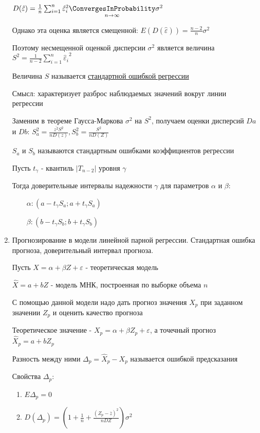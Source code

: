 \begin{enumerate}
    $D(\hat \varepsilon) = \frac{1}{n} \sum_{i = 1}^n {\hat \varepsilon_i}^2 \underset{n \to \infty}{\ConvergesInProbability} \sigma^2$

    Однако эта оценка является смещенной: $E(D(\hat \varepsilon)) = \frac{n - 2}{n} \sigma^2$

    Поэтому несмещенной оценкой дисперсии $\sigma^2$ является величина $S^2 = \frac{1}{n - 2} \sum_{i = 1}^n {\hat \varepsilon_i}^2$

    \Def Величина $S$ называется \hyperlink{regression_coefficient_error}{стандартной ошибкой регрессии}

    Смысл: характеризует разброс наблюдаемых значений вокруг линии регрессии

    \Notas Заменим в теореме Гаусса-Маркова $\sigma^2$ на $S^2$, получаем оценки дисперсий $Da$ и $Db$: $S_a^2 = \frac{\overline{z^2} S^2}{n D(z)}, S^2_b = \frac{S^2}{n D(Z)}$

    \Defs $S_a$ и $S_b$ называются стандартным ошибками коэффициентов регрессии

    Пусть $t_\gamma$ - квантиль $|T_{n - 2}|$ уровня $\gamma$

    Тогда доверительные интервалы надежности $\gamma$ для параметров $\alpha$ и $\beta$:

    $\qquad \alpha: (a - t_\gamma S_a; a + t_\gamma S_a)$

    $\qquad \beta: (b - t_\gamma S_b; b + t_\gamma S_b)$

    \item Прогнозирование в модели линейной парной регрессии. Стандартная ошибка прогноза, доверительный интервал прогноза.

    Пусть $X = \alpha + \beta Z + \varepsilon$ - теоретическая модель

    $\hat X = a + b Z$ - модель МНК, построенная по выборке объема $n$

    С помощью данной модели надо дать прогноз значения $X_p$ при заданном значении $Z_p$ и оценить качество прогноза 

    Теоретическое значение - $X_p = \alpha + \beta Z_p + \varepsilon$, а точечный прогноз $\hat X_p = a + b Z_p$

    Разность между ними $\Delta_p = \hat X_p - X_p$ называется ошибкой предсказания

    Свойства $\Delta_p$:

    \begin{enumerate}
        \item $E \Delta_p = 0$
        \item $D (\Delta_p) = \left(1 + \frac{1}{n} + \frac{(Z_p - \overline{z})^2}{n DZ}\right) \sigma^2$


\end{enumerate}
\end{enumerate}

